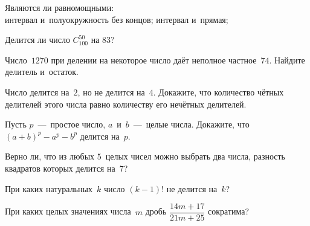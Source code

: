 \documentclass[a4paper,12pt]{article}
\begin{document}
Являются ли равномощными:\\
 интервал и~полуокружность без концов;
 интервал и~прямая;
%
%
%
%
%
%
%
%
%

{}

Делится ли число $C_{100}^{50}$ на $83$?

Число~$1270$ при делении на некоторое число даёт неполное частное~$74$. Найдите делитель и~остаток.

Число делится на~$2$, но не делится на~$4$. Докажите, что количество чётных делителей этого числа равно количеству его нечётных делителей.

Пусть $p$~---~простое число, $a$~и~$b$~---~целые числа. Докажите, что $(a+b)^p-a^p-b^p$ делится на~$p$.

Верно ли, что из любых $5$~целых чисел можно выбрать два числа, разность квадратов которых делится на~$7$?

При каких натуральных~$k$ число $(k-1)!$ не делится на~$k$?

При каких целых значениях числа~$m$ дробь $\dfrac{14m+17}{21m+25}$ сократима?
\end{document}
